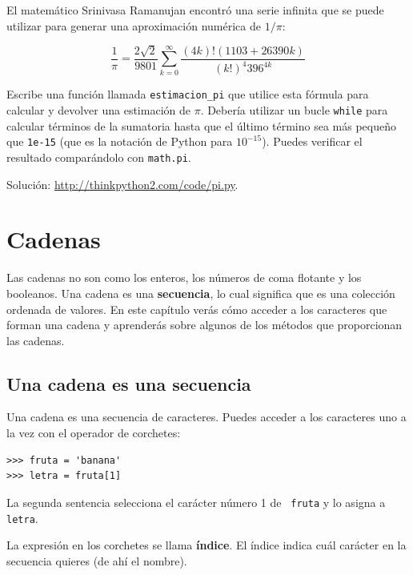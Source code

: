 \documentclass[10pt]{book}
\begin{document}
\begin{exercise}

El matemático Srinivasa Ramanujan encontró una
serie infinita
que se puede utilizar para generar una aproximación
numérica de $1 / \pi$:

\[ \frac{1}{\pi} = \frac{2\sqrt{2}}{9801}
\sum^\infty_{k=0} \frac{(4k)!(1103+26390k)}{(k!)^4 396^{4k}} \]

Escribe una función llamada \verb"estimacion_pi" que utilice esta fórmula
para calcular y devolver una estimación de $\pi$.  Debería utilizar un bucle {\tt while}
para calcular términos de la sumatoria hasta que el último término sea
más pequeño que {\tt 1e-15} (que es la notación de Python para $10^{-15}$).
Puedes verificar el resultado comparándolo con {\tt math.pi}.

Solución: \url{http://thinkpython2.com/code/pi.py}.

\end{exercise}


\chapter{Cadenas}
\label{strings}

Las cadenas no son como los enteros, los números de coma flotante y los booleanos.  Una cadena
es una {\bf secuencia}, lo cual significa que es
una colección ordenada de valores.  En este capítulo verás
cómo acceder a los caracteres que forman una cadena y
aprenderás sobre algunos de los métodos que proporcionan las cadenas.


\section{Una cadena es una secuencia}

Una cadena es una secuencia de caracteres.
Puedes acceder a los caracteres uno a la vez con el
operador de corchetes:

\begin{verbatim}
>>> fruta = 'banana'
>>> letra = fruta[1]
\end{verbatim}
%
La segunda sentencia selecciona el carácter número 1 de {\tt
fruta} y lo asigna a {\tt letra}.

La expresión en los corchetes se llama {\bf índice}.
El índice indica cuál carácter en la secuencia
quieres (de ahí el nombre).
\end{document}

